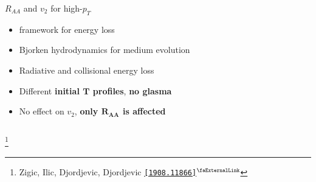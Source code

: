 \documentclass[aspectratio=169,11pt,usenames,dvipsnames]{beamer}
\renewcommand{\thefootnote}{\color{customblue}\faPaperPlaneO}
\newcommand\blfootnote[1]{%
  \begingroup
  \renewcommand\thefootnote{}\footnote{#1}%
  \addtocounter{footnote}{-1}%
  \endgroup
}
\begin{document}
\begin{frame}[t,noframenumbering]
\begin{columns}[onlytextwidth,t]
        \begin{center}
            {\Large\color{palteal} $R_{AA}$ and $v_2$ for high-$p_T$ \\[10pt]}
            \footnotesize
                \begin{itemize}
                    \item {\color{lightgray}{\bfseries DREENA} framework for energy loss}
                    \item {\color{lightgray}Bjorken hydrodynamics for medium evolution}
                    \item {\color{lightgray}Radiative and collisional energy loss}
                    \item {\color{lightgray}Different {\bfseries initial $\boldsymbol{T}$ profiles}, {\bfseries no glasma}}
                    \item {\color{lightgray}No effect on $v_2$, {\bfseries only $\boldsymbol{R_{AA}}$ is affected}}
                \end{itemize}
        \end{center}
    \end{columns}
    \blfootnote{\scriptsize Zigic, Ilic, Djordjevic, Djordjevic \href{https://arxiv.org/abs/1908.11866}{\color{palgold}\texttt{[1908.11866]}$^\text{\scalebox{0.9}{\faExternalLink}}$}}
\end{frame}


\end{document}
